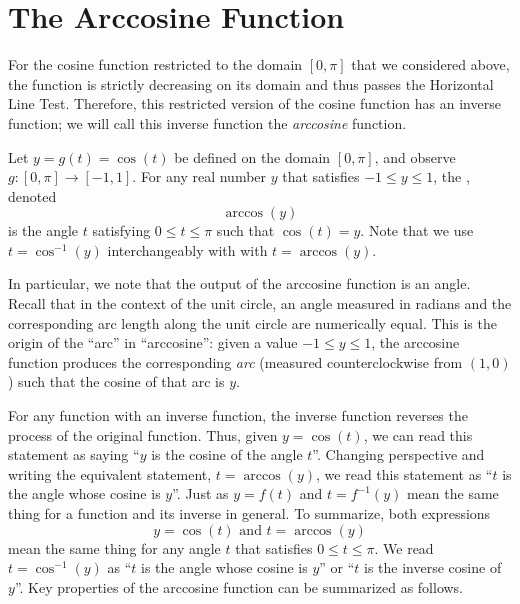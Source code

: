 \documentclass{ximera}
\begin{document}
\section{The Arccosine Function}

For the cosine function restricted to the domain $[0,\pi]$ that we considered above, the function is strictly decreasing on its domain and thus passes the Horizontal Line Test. Therefore, this restricted version of the cosine function has an inverse function; we will call this inverse function the \emph{arccosine} function.%

\begin{definition}
Let $y = g(t) = \cos(t)$ be defined on the domain $[0,\pi]$, and observe $g : [0,\pi] \to [-1,1]$.  For any real number $y$ that satisfies $-1 \leq y \leq 1$, the , denoted%
\begin{equation*}
\arccos(y)
\end{equation*}
is the angle $t$ satisfying $0 \leq t \leq \pi$ such that $\cos(t) = y$.
%
Note that we use $t=\cos^{-1}(y)$ interchangeably with with $t = \arccos(y)$.
\end{definition}

In particular, we note that the output of the arccosine function is an angle. Recall that in the context of the unit circle, an angle measured in radians and the corresponding arc length along the unit circle are numerically equal. This is the origin of the ``arc'' in ``arccosine'': given a value $-1 \leq y \leq 1$, the arccosine function produces the corresponding \emph{arc} (measured counterclockwise from $(1,0)$) such that the cosine of that arc is $y$.%
\par
For any function with an inverse function, the inverse function reverses the process of the original function. Thus, given $y = \cos(t)$, we can read this statement as saying ``$y$ is the cosine of the angle $t$''.  Changing perspective and writing the equivalent statement, $t = \arccos(y)$, we read this statement as ``$t$ is the angle whose cosine is $y$''.  Just as $y = f(t)$ and $t = f^{-1}(y)$ mean the same thing for a function and its inverse in general. 
To summarize, both expressions
\begin{equation*}
y = \cos(t) \text{ and } t = \arccos(y)
\end{equation*}
mean the same thing for any angle $t$ that satisfies $0 \leq t \leq \pi$.  
We read $t = \cos^{-1}(y)$ as ``$t$ is the angle whose cosine is $y$'' or ``$t$ is the inverse cosine of $y$''.  Key properties of the arccosine function can be summarized as follows.%
\end{document}
